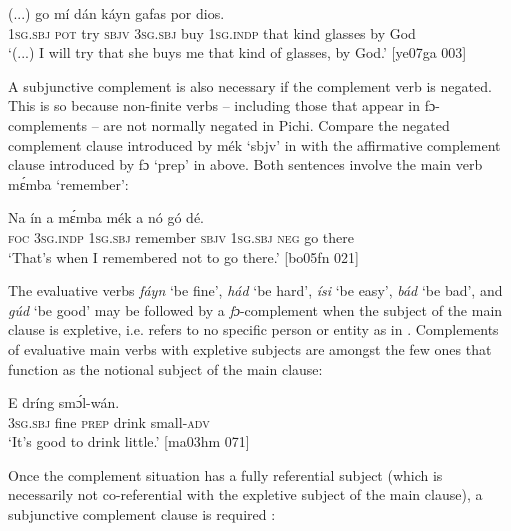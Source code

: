 \ea%
    \label{ex:key:1393}
    \gll (...)     go              mí    dán    káyn
gafas  por  dios.\\
{}  \textsc{1sg.sbj}  \textsc{pot}  try    \textsc{sbjv}    \textsc{3sg.sbj}  buy  \textsc{1sg.indp}  that    kind
glasses  by  God\\

\glt ‘(...) I will try that she buys me that kind of glasses, by God.’ [ye07ga 003]
\z

A subjunctive complement is also necessary if the complement verb is negated. This is so because non-finite verbs – including those that appear in fɔ-complements – are not normally negated in Pichi. Compare the negated complement clause introduced by mék ‘sbjv’ in  with the affirmative complement clause introduced by fɔ ‘prep’ in  above. Both sentences involve the main verb mɛ́mba ‘remember’:


\ea%
    \label{ex:key:1394}
    \gll Na  ín    a    mɛ́mba    mék    a    nó  gó  dé.\\
\textsc{foc}  \textsc{3sg.indp}  \textsc{1sg.sbj}  remember  \textsc{sbjv}    \textsc{1sg.sbj}  \textsc{neg}  go  there\\

\glt ‘That’s when I remembered not to go there.’ [bo05fn 021]
\z

The evaluative verbs \textit{fáyn} ‘be fine’, \textit{hád} ‘be hard’, \textit{ísi} ‘be easy’, \textit{bád} ‘be bad’, and \textit{gúd} ‘be good’ may be followed by a \textit{fɔ}{}-complement when the subject of the main clause is expletive, i.e. refers to no specific person or entity as in . Complements of evaluative main verbs with expletive subjects are amongst the few ones that function as the notional subject of the main clause:


\ea%
    \label{ex:key:1395}
    \gll E       dríng  smɔ́l-wán.\\
\textsc{3sg.sbj}  fine    \textsc{prep}  drink  small\textsc{{}-adv}\\

\glt ‘It’s good to drink little.’ [ma03hm 071]
\z

Once the complement situation has a fully referential subject (which is necessarily not co-referential with the expletive subject of the main clause), a subjunctive complement clause is required :


